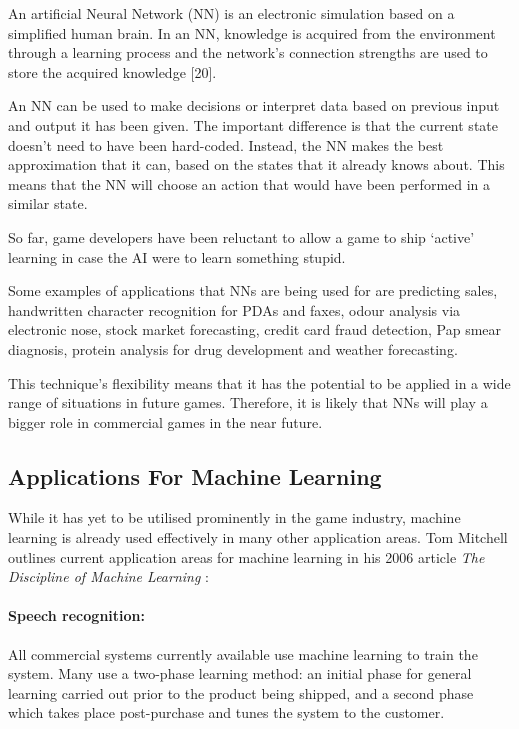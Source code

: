 \documentclass[a4paper,oneside]{report}
\begin{document}
An artificial Neural Network (NN) is an electronic simulation based on a simplified human brain. In an NN, knowledge is acquired from the environment through a learning process and the network’s connection strengths are used to store the acquired knowledge [20].

An NN can be used to make decisions or interpret data based on previous input and output it has been given. The important difference is that the current state doesn’t need to have been hard-coded. Instead, the NN makes the best approximation that it can, based on the states that it already knows about. This means that the NN will choose an action that would have been performed in a similar state.

So far, game developers have been reluctant to allow a game to ship `active' learning in case the AI were to learn something stupid.

Some examples of applications that NNs are being used for are predicting sales, handwritten character recognition for PDAs and faxes, odour analysis via electronic nose, stock market forecasting, credit card fraud detection, Pap smear diagnosis, protein analysis for drug development and weather forecasting. 

This technique’s flexibility means that it has the potential to be applied in a wide range of situations in future games. Therefore, it is likely that NNs will play a bigger role in commercial games in the near future.

\subsection{Applications For Machine Learning}

While it has yet to be utilised prominently in the game industry, machine learning is already used effectively in many other application areas. Tom Mitchell outlines current application areas for machine learning in his 2006 article \emph{The Discipline of Machine Learning} \cite{Mitchell:2006fv}:

\paragraph{Speech recognition:} All commercial systems currently available use machine learning to train the system. Many use a two-phase learning method: an initial phase for general learning carried out prior to the product being shipped, and a second phase which takes place post-purchase and tunes the system to the customer.
\end{document}
